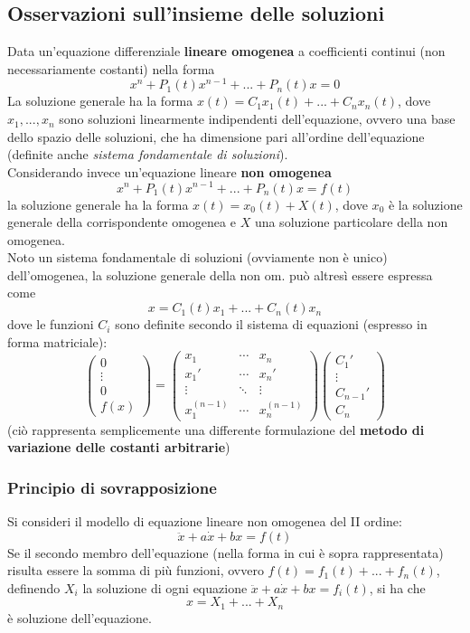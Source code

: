 \documentclass[10pt]{article}
\theoremstyle{plain}
\begin{document}
\subsection{Osservazioni sull'insieme delle soluzioni}
Data un'equazione differenziale \textbf{lineare omogenea} a coefficienti continui (non necessariamente costanti) nella forma
\[x^{n} + P_1(t) x^{n-1} + ... + P_n(t) x = 0\]
La soluzione generale ha la forma $\displaystyle x(t) = C_1 x_1(t) + ... + C_n x_n(t)$, dove $x_1, ..., x_n$ sono soluzioni linearmente indipendenti dell'equazione, ovvero una base dello spazio delle soluzioni, che ha dimensione pari all'ordine dell'equazione (definite anche \textit{sistema fondamentale di soluzioni}).
\\Considerando invece un'equazione lineare \textbf{non omogenea}
\[x^{n} + P_1(t) x^{n-1} + ... + P_n(t) x = f(t)\]
la soluzione generale ha la forma $x(t) = x_0(t) + X(t)$, dove $x_0$ è la soluzione generale della corrispondente omogenea e $X$ una soluzione particolare della non omogenea. 
\\Noto un sistema fondamentale di soluzioni (ovviamente non è unico) dell'omogenea, la soluzione generale della non om. può altresì essere espressa come 
\[x = C_1(t) x_1 + ... + C_n(t) x_n\]
dove le funzioni $C_i$ sono definite secondo il sistema di equazioni (espresso in forma matriciale):
\[\begin{pmatrix}
0\\
\vdots \\
0\\
f(x)
\end{pmatrix} = \begin{pmatrix}
x_1 & \cdots & x_n\\
x_1' & \cdots & x_n'\\
\vdots & \ddots & \vdots\\
x_1^{(n-1)} & \cdots & x_n^{(n-1)}
\end{pmatrix} \begin{pmatrix}
C_1'\\
\vdots \\
C_{n-1}'\\
C_n
\end{pmatrix}\]
(ciò rappresenta semplicemente una differente formulazione del \textbf{metodo di variazione delle costanti arbitrarie})

\subsubsection{Principio di sovrapposizione}
Si consideri il modello di equazione lineare non omogenea del II ordine:
\[\ddot x + a \dot x + b x = f(t)\]
Se il secondo membro dell'equazione (nella forma in cui è sopra rappresentata) risulta essere la somma di più funzioni, ovvero $f(t) = f_1(t) + ... + f_n(t)$, definendo $X_i$ la soluzione di ogni equazione $\ddot x + a \dot x + b x = f_i(t)$, si ha che
\[x = X_1 + ... + X_n\]
è soluzione dell'equazione. 
\end{document}
